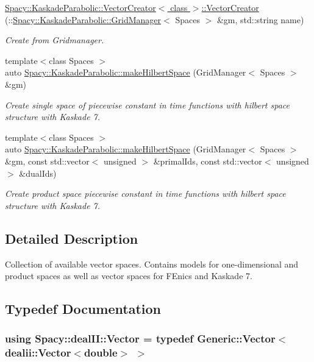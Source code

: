 \begin{DoxyCompactItemize}
\hyperlink{group__VectorSpaceGroup_ga9312a30ec070498e2364676714caf125}{Spacy\-::\-Kaskade\-Parabolic\-::\-Vector\-Creator$<$ class $>$\-::\-Vector\-Creator} (\-::\hyperlink{classSpacy_1_1KaskadeParabolic_1_1GridManager}{Spacy\-::\-Kaskade\-Parabolic\-::\-Grid\-Manager}$<$ Spaces $>$ \&gm, std\-::string name)
\begin{DoxyCompactList}\small\item\em Create from Gridmanager. \end{DoxyCompactList}\item 
{\footnotesize template$<$class Spaces $>$ }\\auto \hyperlink{group__VectorSpaceGroup_gad226c88b4409a3f97dce3136824edde4}{Spacy\-::\-Kaskade\-Parabolic\-::make\-Hilbert\-Space} (Grid\-Manager$<$ Spaces $>$ \&gm)
\begin{DoxyCompactList}\small\item\em Create single space of piecewise constant in time functions with hilbert space structure with Kaskade 7. \end{DoxyCompactList}\item 
{\footnotesize template$<$class Spaces $>$ }\\auto \hyperlink{group__VectorSpaceGroup_ga6e99f8e006f998a69274f5ba2c01f9a3}{Spacy\-::\-Kaskade\-Parabolic\-::make\-Hilbert\-Space} (Grid\-Manager$<$ Spaces $>$ \&gm, const std\-::vector$<$ unsigned $>$ \&primal\-Ids, const std\-::vector$<$ unsigned $>$ \&dual\-Ids)
\begin{DoxyCompactList}\small\item\em Create product space piecewise constant in time functions with hilbert space structure with Kaskade 7. \end{DoxyCompactList}\end{DoxyCompactItemize}


\subsection{Detailed Description}
Collection of available vector spaces. Contains models for one-\/dimensional and product spaces as well as vector spaces for F\-Enics and Kaskade 7. 

\subsection{Typedef Documentation}
\hypertarget{group__VectorSpaceGroup_ga65d64ee5f22f492639d0f950aa931071}{
\subsubsection[{Vector}]{\setlength{\rightskip}{0pt plus 5cm}using {\bf Spacy\-::deal\-I\-I\-::\-Vector} = typedef Generic\-::\-Vector$<$ dealii\-::\-Vector$<$double$>$ $>$}}\label{group__VectorSpaceGroup_ga65d64ee5f22f492639d0f950aa931071}


